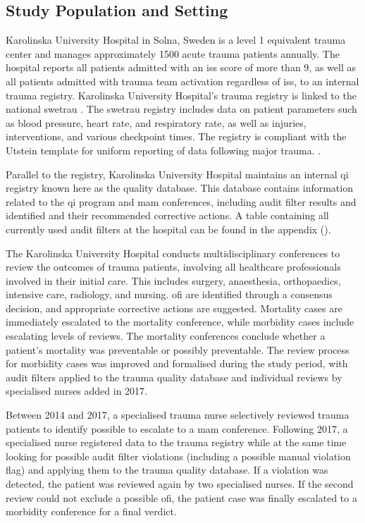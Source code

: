 \documentclass[12pt, a4paper]{article}
\begin{document}
\subsection{Study Population and Setting}
Karolinska University Hospital in Solna, Sweden is a level 1 equivalent trauma center and manages approximately 1500
acute trauma patients annually. The hospital reports all patients admitted with an \acrfull{iss} score of more than 9,
as well as all patients admitted with trauma team activation regardless of \acrshort{iss}, to an internal trauma
registry. Karolinska University Hospital's trauma registry is linked to the national \acrfull{swetrau} \cite{swetrau}.
The \acrshort{swetrau} registry includes data on patient parameters such as blood pressure, heart rate, and respiratory
rate, as well as injuries, interventions, and various checkpoint times. The registry is compliant with the Utstein
template for uniform reporting of data following major trauma. \cite{ringdal_utstein_2008}.

Parallel to the registry, Karolinska University Hospital maintains an internal \acrshort{qi} registry known here as the
quality database. This database contains information related to the \acrshort{qi} program and \acrshort{mam}
conferences, including audit filter results and identified  and their recommended corrective actions. A
table containing all currently used audit filters at the hospital can be found in the appendix
().

The Karolinska University Hospital conducts multidisciplinary conferences to review the outcomes of trauma patients,
involving all healthcare professionals involved in their initial care. This includes surgery, anaesthesia,
orthopaedics, intensive care, radiology, and nursing. \acrshort{ofi} are identified through a consensus decision, and
appropriate corrective actions are suggested. Mortality cases are immediately escalated to the mortality conference,
while morbidity cases include escalating levels of reviews. The mortality conferences conclude whether a patient's
mortality was preventable or possibly preventable. The review process for morbidity cases was improved and formalised
during the study period, with audit filters applied to the trauma quality database and individual reviews by
specialised nurses added in 2017.

Between 2014 and 2017, a specialised trauma nurse selectively reviewed trauma patients to identify possible
 to escalate to a \acrshort{mam} conference. Following 2017, a specialised nurse registered data to the
trauma registry while at the same time looking for possible audit filter violations (including a possible manual
violation flag) and applying them to the trauma quality database. If a violation was detected, the patient was reviewed
again by two specialised nurses. If the second review could not exclude a possible \acrshort{ofi}, the patient case was
finally escalated to a morbidity conference for a final verdict.
\end{document}
